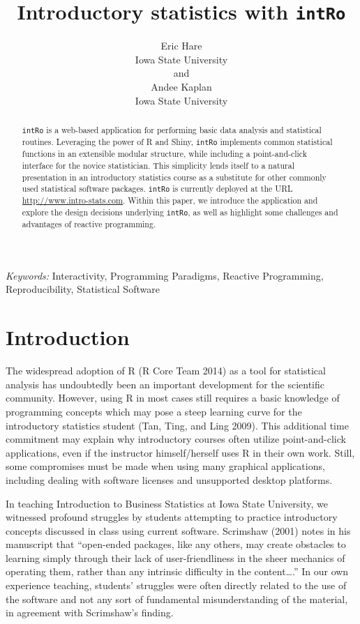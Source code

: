 \documentclass[12pt,]{article}
\title{\bf Introductory statistics with \texttt{intRo}}
\author{Eric Hare \\ Iowa State University \\ \texttt{}  and \\ Andee Kaplan \\ Iowa State University \\ \texttt{} }
\date{}
\begin{document}
\def\spacingset#1{\renewcommand{\baselinestretch}%
{#1}\small\normalsize} \spacingset{1}


\maketitle


\begin{abstract}
\texttt{intRo} is a web-based application for performing basic data
analysis and statistical routines. Leveraging the power of R and Shiny,
\texttt{intRo} implements common statistical functions in an extensible
modular structure, while including a point-and-click interface for the
novice statistician. This simplicity lends itself to a natural
presentation in an introductory statistics course as a substitute for
other commonly used statistical software packages. \texttt{intRo} is
currently deployed at the URL \url{http://www.intro-stats.com}. Within
this paper, we introduce the application and explore the design
decisions underlying \texttt{intRo}, as well as highlight some
challenges and advantages of reactive programming.
\end{abstract}

\noindent%
{\it Keywords:}  Interactivity, Programming Paradigms, Reactive Programming,
Reproducibility, Statistical Software
\vfill

\newpage
\spacingset{1.45} %


\section{Introduction}\label{introduction}

The widespread adoption of R (R Core Team 2014) as a tool for
statistical analysis has undoubtedly been an important development for
the scientific community. However, using R in most cases still requires
a basic knowledge of programming concepts which may pose a steep
learning curve for the introductory statistics student (Tan, Ting, and
Ling 2009). This additional time commitment may explain why introductory
courses often utilize point-and-click applications, even if the
instructor himself/herself uses R in their own work. Still, some
compromises must be made when using many graphical applications,
including dealing with software licenses and unsupported desktop
platforms.

In teaching Introduction to Business Statistics at Iowa State
University, we witnessed profound struggles by students attempting to
practice introductory concepts discussed in class using current
software. Scrimshaw (2001) notes in his manuscript that ``open-ended
packages, like any others, may create obstacles to learning simply
through their lack of user-friendliness in the sheer mechanics of
operating them, rather than any intrinsic difficulty in the
content\ldots{}.'' In our own experience teaching, students' struggles
were often directly related to the use of the software and not any sort
of fundamental misunderstanding of the material, in agreement with
Scrimshaw's finding.
\end{document}
